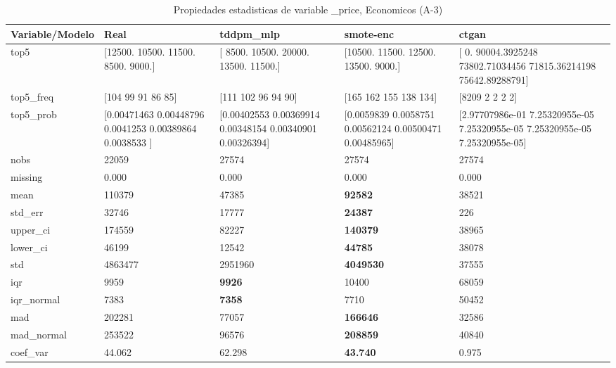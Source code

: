 \begin{table}[H]
\centering
\fontsize{8}{14}\selectfont
\caption{Propiedades  estadisticas de variable \_price, Economicos (A-3)}
\label{table-stats-economicos-a-3-_price}
\begin{tabular}{|l|m{10em}|m{10em}|m{10em}|m{10em}|}
\hline
 \rowcolor[gray]{0.8}
Variable/Modelo & Real & tddpm\_mlp & smote-enc & ctgan \\
\hline top5 & [12500. 10500. 11500.  8500.  9000.] & [ 8500. 10500. 20000. 13500. 11500.] & [10500. 11500. 12500. 13500.  9000.] & [    0.         90004.3925248  73802.71034456 71815.36214198
 75642.89288791] \\
\hline top5\_freq & [104  99  91  86  85] & [111 102  96  94  90] & [165 162 155 138 134] & [8209    2    2    2    2] \\
\hline top5\_prob & [0.00471463 0.00448796 0.0041253  0.00389864 0.0038533 ] & [0.00402553 0.00369914 0.00348154 0.00340901 0.00326394] & [0.0059839  0.0058751  0.00562124 0.00500471 0.00485965] & [2.97707986e-01 7.25320955e-05 7.25320955e-05 7.25320955e-05
 7.25320955e-05] \\
\hline nobs & 22059 & 27574 & 27574 & 27574 \\
\hline missing & 0.000 & 0.000 & 0.000 & 0.000 \\
\hline mean & 110379 & 47385 & \bfseries 92582 & \cellcolor[rgb]{0.9, 0.54, 0.52} 38521 \\
\hline std\_err & 32746 & 17777 & \bfseries 24387 & \cellcolor[rgb]{0.9, 0.54, 0.52} 226 \\
\hline upper\_ci & 174559 & 82227 & \bfseries 140379 & \cellcolor[rgb]{0.9, 0.54, 0.52} 38965 \\
\hline lower\_ci & 46199 & \cellcolor[rgb]{0.9, 0.54, 0.52} 12542 & \bfseries 44785 & 38078 \\
\hline std & 4863477 & 2951960 & \bfseries 4049530 & \cellcolor[rgb]{0.9, 0.54, 0.52} 37555 \\
\hline iqr & 9959 & \bfseries 9926 & 10400 & \cellcolor[rgb]{0.9, 0.54, 0.52} 68059 \\
\hline iqr\_normal & 7383 & \bfseries 7358 & 7710 & \cellcolor[rgb]{0.9, 0.54, 0.52} 50452 \\
\hline mad & 202281 & 77057 & \bfseries 166646 & \cellcolor[rgb]{0.9, 0.54, 0.52} 32586 \\
\hline mad\_normal & 253522 & 96576 & \bfseries 208859 & \cellcolor[rgb]{0.9, 0.54, 0.52} 40840 \\
\hline coef\_var & 44.062 & 62.298 & \bfseries 43.740 & \cellcolor[rgb]{0.9, 0.54, 0.52} 0.975 \\

\end{tabular}
\end{table}
